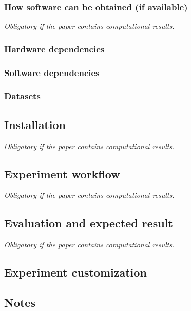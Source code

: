 \documentclass{IEEETran}
\begin{document}
\subsubsection{How software can be obtained (if available)}

{\em Obligatory if the paper contains computational results.}

\subsubsection{Hardware dependencies}

\subsubsection{Software dependencies}

\subsubsection{Datasets}

\subsection{Installation}

{\em Obligatory if the paper contains computational results.}

\subsection{Experiment workflow}

{\em Obligatory if the paper contains computational results.}

\subsection{Evaluation and expected result}

{\em Obligatory if the paper contains computational results.}

\subsection{Experiment customization}

\subsection{Notes}

\end{document}
